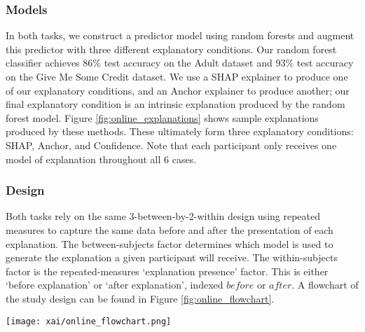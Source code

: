 \subsubsection{Models}
In both tasks, we construct a predictor model using random forests and augment this predictor with three different explanatory conditions. Our random forest classifier achieves $86\%$ test accuracy on the Adult dataset and $93\%$ test accuracy on the Give Me Some Credit dataset. We use a SHAP explainer to produce one of our explanatory conditions, and an Anchor explainer to produce another; our final explanatory condition is an intrinsic explanation produced by the random forest model. Figure \ref{fig:online_explanations} shows sample explanations produced by these methods. These ultimately form three explanatory conditions: SHAP, Anchor, and Confidence. Note that each participant only receives one model of explanation throughout all 6 cases. 

\subsubsection{Design}
Both tasks rely on the same 3-between-by-2-within design using repeated measures to capture the same data before and after the presentation of each explanation. The between-subjects factor determines which model is used to generate the explanation a given participant will receive. The within-subjects factor is the repeated-measures `explanation presence' factor. This is either `before explanation' or `after explanation', indexed $before$ or $after$. A flowchart of the study design can be found in Figure \ref{fig:online_flowchart}.

\begin{figure*}[htbp]
    \centering
    \texttt{[image: xai/online\_flowchart.png]}
    \caption{Participants in the online study are sorted into six buckets, where each bucket is segregated by explanatory condition and task and shown a brief description of the task (i.e., each participant sees only one of the explanations in Figure \ref{fig:online_explanations}). Then, each participant is shown 6 cases. In each case, participants are shown an applicant profile and an AI output. Participants are asked to agree or disagree with the AI output. Then, participants are given explanations based on their explanatory condition scores. They are then asked again to agree or disagree with the AI output.}
    \label{fig:online_flowchart}
\end{figure*}

